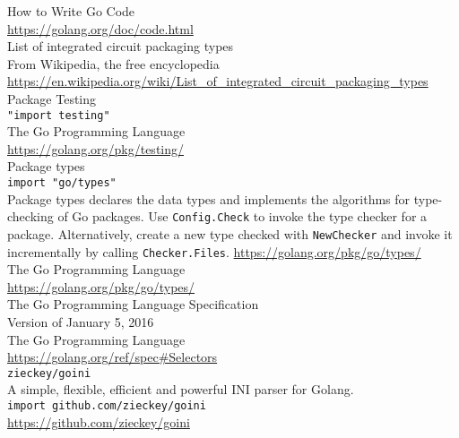 \documentclass[12pt,letterpaper,dvips]{article}
\begin{document}
\noindent How to Write Go Code\\
\href{https://golang.org/doc/code.html}{https://golang.org/doc/code.html}
\\

\noindent List of integrated circuit packaging types\\
From Wikipedia, the free encyclopedia\\
\href{https://en.wikipedia.org/wiki/List\_of\_integrated\_circuit\_packaging\_types}{https://en.wikipedia.org/wiki/List\_of\_integrated\_circuit\_packaging\_types}
\\

\noindent Package Testing\\
\texttt{"import testing"}\\
The Go Programming Language\\
\href{https://golang.org/pkg/testing/}{https://golang.org/pkg/testing/}
\\

\noindent Package types\\
\texttt{import "go/types"}\\
Package types declares the data types and implements
the algorithms for type-checking of Go packages. Use
\texttt{Config.Check} to invoke the type checker for
a package.  Alternatively, create a new type checked
with \texttt{NewChecker} and invoke it incrementally
by calling \texttt{Checker.Files}.
\href{https://golang.org/pkg/go/types/}{https://golang.org/pkg/go/types/}
\\

\noindent The Go Programming Language\\
\href{https://golang.org/pkg/go/types/}{https://golang.org/pkg/go/types/}
\\

\noindent The Go Programming Language Specification\\
Version of January 5, 2016\\
The Go Programming Language\\
\href{https://golang.org/ref/spec\#Selectors}{https://golang.org/ref/spec\#Selectors}
\\


\newpage
\noindent \texttt{zieckey/goini}\\
A simple, flexible, efficient and powerful INI parser for Golang.\\
\texttt{import github.com/zieckey/goini}\\
\href{https://github.com/zieckey/goini}{https://github.com/zieckey/goini}
\end{document}
